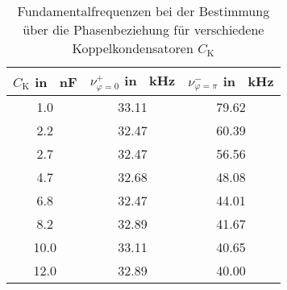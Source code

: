 \begin{table}[h!]
\begin{center}
\begin{tabular}{c | c | c}
	$C_\text{K}$ in \SI{}{\nano\farad} & $\nu_{\varphi=0}^+$ in \SI{}{\kilo\hertz} & $\nu_{\varphi=\pi}^-$ in \SI{}{\kilo\hertz} \\
\hline
	1.0 & 33.11 & 79.62 \\
	2.2 & 32.47 & 60.39 \\
	2.7 & 32.47 & 56.56 \\
	4.7 & 32.68 & 48.08 \\
	6.8 & 32.47 & 44.01 \\
	8.2 & 32.89 & 41.67 \\
	10.0 & 33.11 & 40.65 \\
	12.0 & 32.89 & 40.00 \\
\end{tabular}
\end{center}
\caption{Fundamentalfrequenzen bei der Bestimmung über die Phasenbeziehung für verschiedene Koppelkondensatoren $C_\text{K}$}
\label{fig:Freq_Phase}
\end{table}